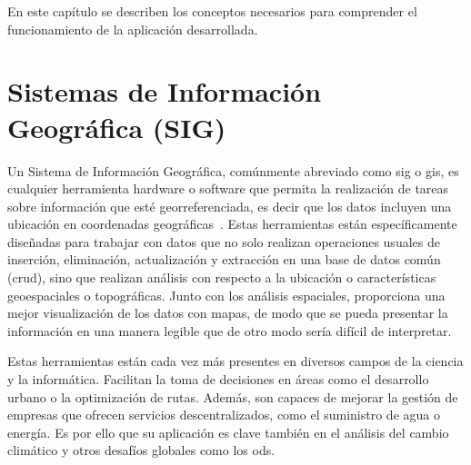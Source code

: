 
En este capítulo se describen los conceptos necesarios para comprender el funcionamiento de la aplicación desarrollada.

\section{Sistemas de Información Geográfica (SIG)}
	Un Sistema de Información Geográfica, comúnmente abreviado como \acrshort{sig} o \acrshort{gis}, es cualquier herramienta hardware o software que permita la realización de tareas sobre información que esté georreferenciada, es decir que los datos incluyen una ubicación en coordenadas geográficas~\cite{qgis_introduction_gis}.
	Estas herramientas están específicamente diseñadas para trabajar con datos que no solo realizan operaciones usuales de inserción, eliminación, actualización y extracción en una base de datos común (\acrshort{crud}), sino que realizan análisis con respecto a la ubicación o características geoespaciales o topográficas. Junto con los análisis espaciales, proporciona una mejor visualización de los datos con mapas, de modo que se pueda presentar la información en una manera legible que de otro modo sería difícil de interpretar.
	 
	Estas herramientas están cada vez más presentes en diversos campos de la ciencia y la informática. Facilitan la toma de decisiones en áreas como el desarrollo urbano o la optimización de rutas. Además, son capaces de mejorar la gestión de empresas que ofrecen servicios descentralizados, como el suministro de agua o energía. Es por ello que su aplicación es clave también en el análisis del cambio climático y otros desafíos globales como los \acrlong{ods}.
	
